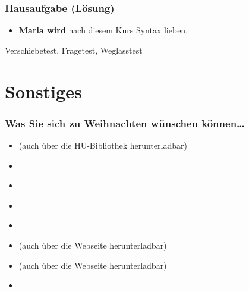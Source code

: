{\begin{frame}
\end{frame}



\begin{frame}
\frametitle{Hausaufgabe (Lösung)}

\begin{itemize}
	\item[] \textbf{Maria wird} nach diesem Kurs Syntax lieben.
\end{itemize}

\pause 

\ea Verschiebetest, Fragetest, Weglasstest \ras {}
	\z 
\z

\end{frame}

} %


\section{Sonstiges}


\begin{frame}
\frametitle{Was Sie sich zu Weihnachten wünschen können\dots}

\begin{itemize}
	\item \citet{Glueck&Roedel16a} (auch über die HU-Bibliothek herunterladbar)
	\item \citet{Luedeling2009}
	\item \citet{Brandt&Co06a}
	\item \citet{Grewendorf&Co91a}
	\item \citet{Chomsky65a}
	\item \citet{MuellerS15b} (auch über die Webseite herunterladbar)
	\item \citet{MuellerS13f} (auch über die Webseite herunterladbar)
	\item \citet{Pinker95a}

\end{itemize}

\end{frame}


